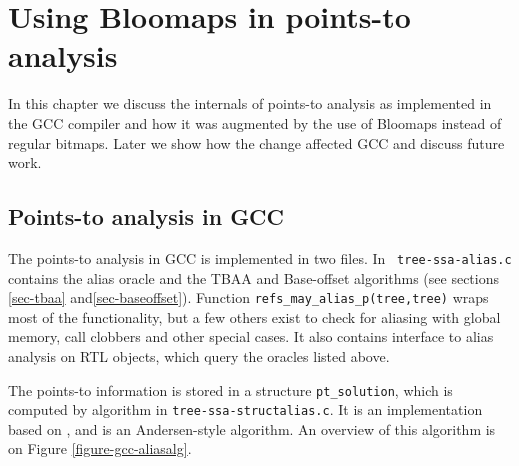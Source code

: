 \chapter{Using Bloomaps in points-to analysis}
\label{chap-bloomaps-aa}

In this chapter we discuss the internals of points-to analysis as
implemented in the GCC compiler and how it was augmented by the use of Bloomaps
instead of regular bitmaps. Later we show how the change affected GCC and
discuss future work.

\section{Points-to analysis in GCC}

The points-to analysis in GCC is implemented in two files. In {\tt
tree-ssa-alias.c} contains the alias oracle and the TBAA and Base-offset
algorithms (see sections \ref{sec-tbaa} and\ref{sec-baseoffset}).
Function {\tt refs\_may\_alias\_p(tree,tree)} wraps most of the functionality,
but a few others exist to check for aliasing with global memory, call clobbers
and other special cases. It also contains interface to alias analysis on RTL
objects, which query the oracles listed above.

The points-to information is stored in a structure {\tt pt\_solution}, which is
computed by algorithm in {\tt tree-ssa-structalias.c}. It is an implementation
based on \cite{Pearce2004,Heintze2001}, and is an Andersen-style algorithm. An
overview of this algorithm is on Figure \ref{figure-gcc-aliasalg}.


